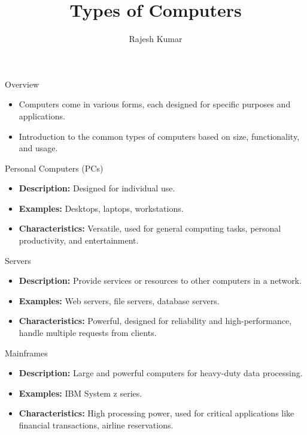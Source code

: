 \title{Types of Computers}
\author{Rajesh Kumar}
\date{}


\begin{frame}
  \titlepage
\end{frame}

\begin{frame}{Overview}
  \begin{itemize}
    \item Computers come in various forms, each designed for specific purposes and applications.
    \item Introduction to the common types of computers based on size, functionality, and usage.
  \end{itemize}
\end{frame}

\begin{frame}{Personal Computers (PCs)}
  \begin{itemize}
    \item \textbf{Description:} Designed for individual use.
    \item \textbf{Examples:} Desktops, laptops, workstations.
    \item \textbf{Characteristics:} Versatile, used for general computing tasks, personal productivity, and entertainment.
  \end{itemize}
\end{frame}

\begin{frame}{Servers}
  \begin{itemize}
    \item \textbf{Description:} Provide services or resources to other computers in a network.
    \item \textbf{Examples:} Web servers, file servers, database servers.
    \item \textbf{Characteristics:} Powerful, designed for reliability and high-performance, handle multiple requests from clients.
  \end{itemize}
\end{frame}

\begin{frame}{Mainframes}
  \begin{itemize}
    \item \textbf{Description:} Large and powerful computers for heavy-duty data processing.
    \item \textbf{Examples:} IBM System z series.
    \item \textbf{Characteristics:} High processing power, used for critical applications like financial transactions, airline reservations.
  \end{itemize}
\end{frame}

